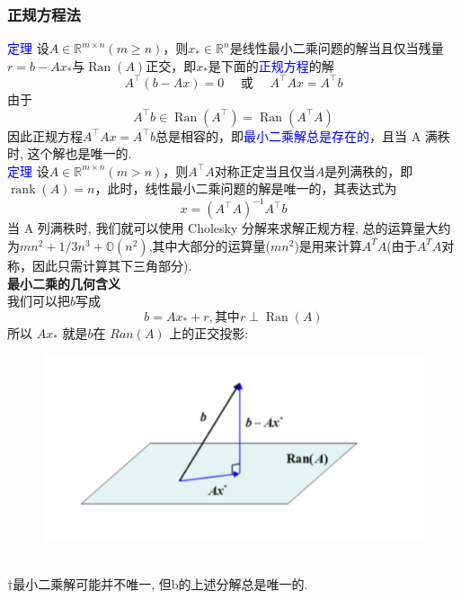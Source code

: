 \documentclass[12pt,a4paper]{article}
\begin{document}
\subsubsection{正规方程法}
\textcolor{blue}{定理} 设$A \in \mathbb{R}^{m \times n}(m \geq n)$，则$x_{*} \in \mathbb{R}^{n}$是线性最小二乘问题的解当且仅当残量$r=b-A x_{*}$与$\operatorname{Ran}(A)$正交，即$x_{*}$是下面的\textcolor{blue}{正规方程}的解
\begin{equation}
A^{\top}(b-A x)=0 \quad \text { 或 } \quad A^{\top} A x=A^{\top} b
\end{equation}
由于
$$
A^{\top} b \in \operatorname{Ran}\left(A^{\top}\right)=\operatorname{Ran}\left(A^{\top} A\right)
$$
因此正规方程$A^{\top} A x=A^{\top} b$总是相容的，即\textcolor{blue}{最小二乘解总是存在的}，且当 A 满秩时, 这个解也是唯一的.\\

\textcolor{blue}{定理} 设$A \in \mathbb{R}^{m \times n}(m>n)$，则$A^{\top} A$对称正定当且仅当$A$是列满秩的，即
$\operatorname{rank}(A)=n$，此时，线性最小二乘问题的解是唯一的，其表达式为
$$
x=\left(A^{\top} A\right)^{-1} A^{\top} b
$$
当 A 列满秩时, 我们就可以使用 Cholesky 分解来求解正规方程, 总的运算量大约为$mn^{2}+1/3n^{3}+\mathbb{O}(n^{2})$,其中大部分的运算量($mn^{2}$)是用来计算$A^{T}A$(由于$A^{T}A$对称，因此只需计算其下三角部分).\\

\textbf{最小二乘的几何含义}\\
我们可以把$b$写成
\begin{equation}
b=A x_{*}+r, \text  {其中} r \perp \operatorname{Ran}(A)
\end{equation}
所以 $Ax_{*}$ 就是$b$在 $Ran(A)$ 上的正交投影:
\begin{figure}[htbp]
	\begin{center}
		\includegraphics[scale=1]{figuresl/figure2.png}
		\label{default}
	\end{center}
\end{figure}
\\
$\dagger$最小二乘解可能并不唯一, 但b的上述分解总是唯一的.\\
\end{document}
